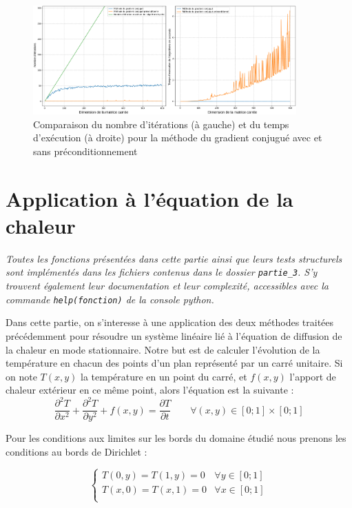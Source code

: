 \documentclass{article}
\begin{document}
\begin{figure}[!htbp]
  \centering
  \includegraphics[width=0.90\textwidth]{images/Nombre_iterations_Temps.pdf}
  \caption{Comparaison du nombre d'itérations (à gauche) et du temps d'exécution (à droite) pour la méthode du gradient conjugué avec et sans préconditionnement} 
  \label{fig:Nombre_iterations_Temps}
\end{figure}

 

\section{Application à l'équation de la chaleur}

\textit{Toutes les fonctions présentées dans cette partie ainsi que leurs tests structurels sont implémentés dans les fichiers contenus dans le dossier \texttt{partie\_3}. S'y trouvent également leur documentation et leur complexité, accessibles avec la commande \texttt{help(fonction)} de la console python.}
\vspace{10pt}

Dans cette partie, on s'interesse à une application des deux méthodes traitées précédemment pour résoudre un système linéaire lié à l'équation de diffusion de la chaleur en mode stationnaire. Notre but est de calculer l'évolution de la température en chacun des points d'un plan représenté par un carré unitaire. Si on note $T(x,y)$ la température en un point du carré, et $f(x,y)$ l’apport de chaleur extérieur en ce même point, alors l’équation est la suivante :
$$\displaystyle{\frac{\partial^2 T}{\partial x^2} + \frac{\partial^2 T}{\partial y^2} + f(x,y)= \dfrac{\partial T}{\partial t} \quad \quad \forall(x,y) \in [0;1] \times [0;1]}$$

Pour les conditions aux limites sur les bords du domaine étudié nous prenons les conditions au bords de Dirichlet :

\[ \left\{
\begin{array}{rcr}
  T(0,y) =  T(1,y) =  0 & \forall y \in [0;1]\\
  T(x,0) = T(x,1)  =  0 & \forall x \in [0;1]\\
\end{array}
\right.\]
\end{document}
